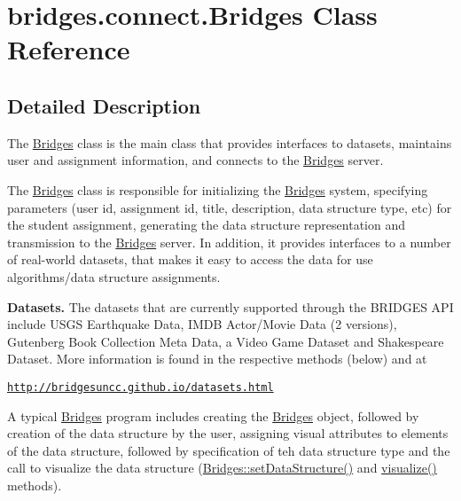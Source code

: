 \hypertarget{classbridges_1_1connect_1_1_bridges}{}\section{bridges.\+connect.\+Bridges Class Reference}
\label{classbridges_1_1connect_1_1_bridges}


\subsection{Detailed Description}
The \mbox{\hyperlink{classbridges_1_1connect_1_1_bridges}{Bridges}} class is the main class that provides interfaces to datasets, maintains user and assignment information, and connects to the \mbox{\hyperlink{classbridges_1_1connect_1_1_bridges}{Bridges}} server. 

The \mbox{\hyperlink{classbridges_1_1connect_1_1_bridges}{Bridges}} class is responsible for initializing the \mbox{\hyperlink{classbridges_1_1connect_1_1_bridges}{Bridges}} system, specifying parameters (user id, assignment id, title, description, data structure type, etc) for the student assignment, generating the data structure representation and transmission to the \mbox{\hyperlink{classbridges_1_1connect_1_1_bridges}{Bridges}} server. In addition, it provides interfaces to a number of real-\/world datasets, that makes it easy to access the data for use algorithms/data structure assignments. ~\newline


{\bfseries Datasets.} The datasets that are currently supported through the B\+R\+I\+D\+G\+ES A\+PI include U\+S\+GS Earthquake Data, I\+M\+DB Actor/\+Movie Data (2 versions), Gutenberg Book Collection Meta Data, a Video Game Dataset and Shakespeare Dataset. More information is found in the respective methods (below) and at 

\href{http://bridgesuncc.github.io/datasets.html}{\tt http\+://bridgesuncc.\+github.\+io/datasets.\+html} 

A typical \mbox{\hyperlink{classbridges_1_1connect_1_1_bridges}{Bridges}} program includes creating the \mbox{\hyperlink{classbridges_1_1connect_1_1_bridges}{Bridges}} object, followed by creation of the data structure by the user, assigning visual attributes to elements of the data structure, followed by specification of teh data structure type and the call to visualize the data structure (\mbox{\hyperlink{classbridges_1_1connect_1_1_bridges_a921a6603b2445b1abe30a1b3d6f0c255}{Bridges\+::set\+Data\+Structure()}} and \mbox{\hyperlink{classbridges_1_1connect_1_1_bridges_a1853d64ffb8675ba2ec227a2b819cd24}{visualize()}} methods).

